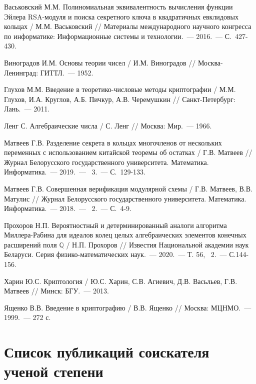 \begin{thebibliography}{99}
    Васьковский М.М. Полиномиальная эквивалентность вычисления функции Эйлера RSA-модуля и поиска секретного ключа в квадратичных евклидовых кольцах / М.М. Васьковский // Материалы международного научного конгресса по информатике: Информационные системы и технологии.~--- 2016.~--- С.~427-430.

    Виноградов И.М. Основы теории чисел / И.М. Виноградов // Москва-Ленинград: ГИТТЛ.~--- 1952.

    Глухов М.М. Введение в теоретико-числовые методы криптографии / М.М. Глухов, И.А. Круглов, А.Б. Пичкур, А.В. Черемушкин // Санкт-Петербург: Лань.~--- 2011.

    Ленг С. Алгебраические числа / С. Ленг // Москва: Мир.~--- 1966.

    Матвеев Г.В. Разделение секрета в кольцах многочленов от нескольких переменных с использованием китайской теоремы об остатках / Г.В. Матвеев // Журнал Белорусского государственного университета. Математика. Информатика.~--- 2019.~--- \textnumero~3.~--- С.~129-133.
    
    Матвеев Г.В. Совершенная верификация модулярной схемы / Г.В. Матвеев, В.В. Матулис // Журнал Белорусского государственного университета. Математика. Информатика.~--- 2018.~--- \textnumero~2.~--- С.~4-9.

    Прохоров Н.П. Вероятностный и детерминированный аналоги алгоритма Миллера-Рабина для идеалов колец целых алгебраических элементов конечных расширений поля $\mathbb{Q}$ / Н.П. Прохоров // Известия Национальной академии наук Беларуси. Серия физико-математических наук.~--- 2020.~--- Т. 56, \textnumero~2.~--- С.144-156.
    
    Харин Ю.С. Криптология / Ю.С. Харин, С.В. Агиевич, Д.В. Васьльев, Г.В. Матвеев // Минск: БГУ.~--- 2013.

    Ященко В.В. Введение в криптографию / В.В. Ященко // Москва: МЦНМО.~--- 1999.~--- 272 с.

\end{thebibliography}

\newpage
\section*{Список публикаций соискателя ученой степени}

